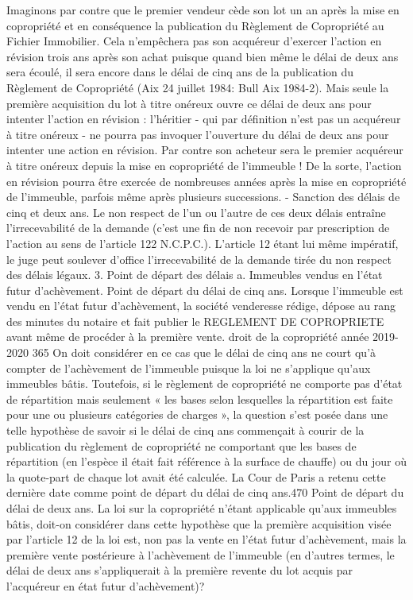 Imaginons par contre que le premier vendeur cède son lot un an après la mise en copropriété et en conséquence la publication du Règlement de Copropriété au Fichier Immobilier. Cela n'empêchera pas son acquéreur d'exercer l'action en révision trois ans après son achat puisque quand bien même le délai de deux ans sera écoulé, il sera encore dans le délai de cinq ans de la publication du Règlement de Copropriété (Aix 24 juillet 1984: Bull Aix 1984-2).
Mais seule la première acquisition du lot à titre onéreux ouvre ce délai de deux ans pour intenter l'action en révision : l'héritier - qui par définition n'est pas un acquéreur à titre onéreux - ne pourra pas invoquer l'ouverture du délai de deux ans pour intenter une action en révision. Par contre son acheteur sera le premier acquéreur à titre onéreux depuis la mise en copropriété de l’immeuble !
De la sorte, l'action en révision pourra être exercée de nombreuses années après la mise en copropriété de l'immeuble, parfois même après plusieurs successions.
- Sanction des délais de cinq et deux ans.
Le non respect de l'un ou l'autre de ces deux délais entraîne l'irrecevabilité de la demande (c'est une fin de non recevoir par prescription de l'action au sens de l'article 122 N.C.P.C.). L'article 12 étant lui même impératif, le juge peut soulever d'office l'irrecevabilité de la demande tirée du non respect des délais légaux.
3. Point de départ des délais
a. Immeubles vendus en l'état futur d'achèvement.
Point de départ du délai de cinq ans.
Lorsque l'immeuble est vendu en l'état futur d'achèvement, la société venderesse rédige, dépose au rang des minutes du notaire et fait publier le REGLEMENT DE COPROPRIETE avant même de procéder à la première vente.
droit de la copropriété année 2019-2020
365
On doit considérer en ce cas que le délai de cinq ans ne court qu’à compter de l’achèvement de l’immeuble puisque la loi ne s’applique qu’aux immeubles bâtis.
Toutefois, si le règlement de copropriété ne comporte pas d’état de répartition mais seulement « les bases selon lesquelles la répartition est faite pour une ou plusieurs catégories de charges », la question s’est posée dans une telle hypothèse de savoir si le délai de cinq ans commençait à courir de la publication du règlement de copropriété ne comportant que les bases de répartition (en l’espèce il était fait référence à la surface de chauffe) ou du jour où la quote-part de chaque lot avait été calculée.
La Cour de Paris a retenu cette dernière date comme point de départ du délai de cinq ans.470
Point de départ du délai de deux ans.
La loi sur la copropriété n'étant applicable qu'aux immeubles bâtis, doit-on considérer dans cette hypothèse que la première acquisition visée par l'article 12 de la loi est, non pas la vente en l'état futur d'achèvement, mais la première vente postérieure à l'achèvement de l'immeuble (en d'autres termes, le délai de deux ans s'appliquerait à la première revente du lot acquis par l'acquéreur en état futur d'achèvement)?
